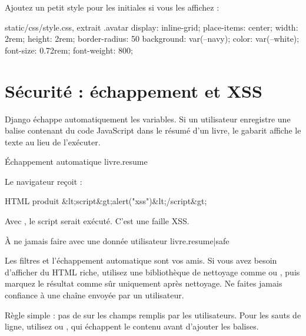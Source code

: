 Ajoutez un petit style pour les initiales si vous les affichez :

\begin{codebox}[css]{static/css/style.css, extrait}
.avatar {
  display: inline-grid;
  place-items: center;
  width: 2rem;
  height: 2rem;
  border-radius: 50%
  background: var(--navy);
  color: var(--white);
  font-size: 0.72rem;
  font-weight: 800;
}
\end{codebox}

\section{Sécurité : échappement et XSS}

Django échappe automatiquement les variables. Si un utilisateur enregistre une
balise  contenant du code JavaScript dans le résumé d'un livre, le
gabarit affiche le texte au lieu de l'exécuter.

\begin{codebox}[html]{Échappement automatique}
{{ livre.resume }}
\end{codebox}

Le navigateur reçoit :

\begin{codebox}[html]{HTML produit}
&lt;script&gt;alert("xss")&lt;/script&gt;
\end{codebox}

Avec , le script serait exécuté. C'est une faille XSS.

\begin{codebox}[html]{À ne jamais faire avec une donnée utilisateur}
{{ livre.resume|safe }}
\end{codebox}

\begin{attention}
Les filtres  et l'échappement automatique sont vos amis. Si vous
avez besoin d'afficher du HTML riche, utilisez une bibliothèque de nettoyage comme
 ou , puis marquez le résultat comme sûr uniquement après
nettoyage. Ne faites jamais confiance à une chaîne envoyée par un utilisateur.
\end{attention}

\begin{bonne}
Règle simple : pas de  sur les champs remplis par les utilisateurs. Pour
les sauts de ligne, utilisez  ou , qui
échappent le contenu avant d'ajouter les balises.
\end{bonne}

